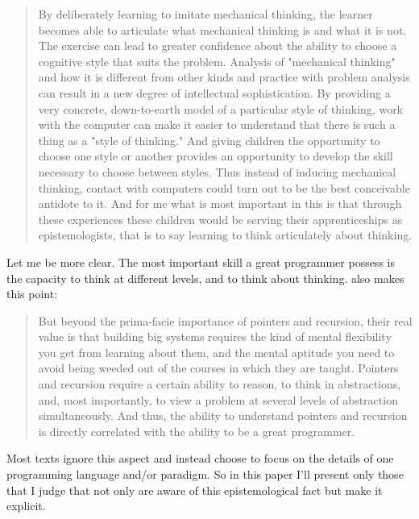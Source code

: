\begin{quotation}
        By deliberately learning to imitate mechanical thinking, the learner becomes
    able to articulate what mechanical thinking is and what it is not. The
    exercise can lead to greater confidence about the ability to choose a
    cognitive style that suits the problem.  Analysis of "mechanical thinking"
    and how it is different from other kinds and practice with problem analysis
    can result in a new degree of intellectual sophistication. By providing a
    very concrete, down-to-earth model of a particular style of thinking, work
    with the computer can make it easier to understand that there is such a
    thing as a "style of thinking." And giving children the opportunity to
    choose one style or another provides an opportunity to develop the skill
    necessary to choose between styles. Thus instead of inducing mechanical
    thinking, contact with computers could turn out to be the best conceivable
    antidote to it. And for me what is most important in this is that through
    these experiences these children would be serving their apprenticeships as
    epistemologists, that is to say learning to think articulately about
    thinking.
\end{quotation}

Let me be more clear. The most important skill a great programmer possess is 
the capacity to think at different levels, and to think about thinking.
\cite{education:spolsky__the_perils_of_java_schools} also makes this
point:

\begin{quotation}
    But beyond the prima-facie importance of pointers and recursion, their real
    value is that building big systems requires the kind of mental flexibility you
    get from learning about them, and the mental aptitude you need to avoid being
    weeded out of the courses in which they are taught. Pointers and recursion
    require a certain ability to reason, to think in abstractions, and, most
    importantly, to view a problem at several levels of abstraction simultaneously.
    And thus, the ability to understand pointers and recursion is directly
    correlated with the ability to be a great programmer.
\end{quotation}

Most texts ignore this aspect and instead choose to focus on the details of one
programming language and/or paradigm. So in this paper I'll present only those
that I judge that not only are aware of this epistemological fact but make it
explicit.

